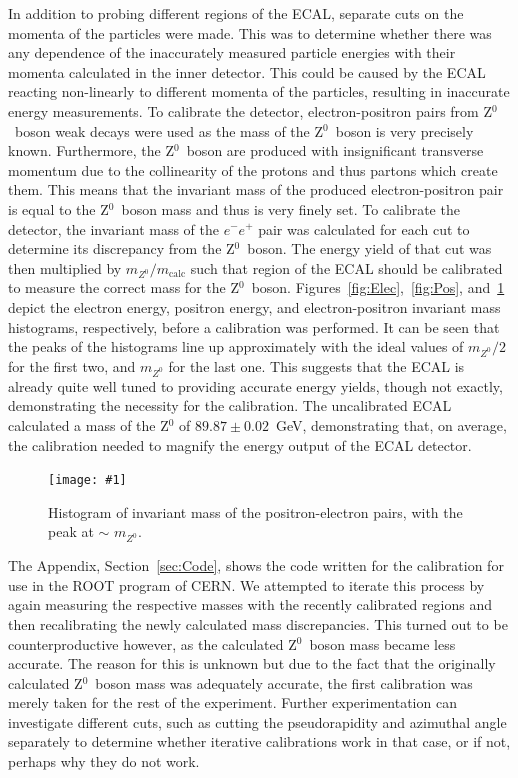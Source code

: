 \documentclass[twocolumn]{article}
\newcommand{\insertFigure}[1]{%
   \texttt{[image: \#1]}%
}
\begin{document}
\par In addition to probing different regions of the ECAL, separate cuts on the momenta of the particles were made. This was to determine whether there was any dependence of the inaccurately measured particle energies with their momenta calculated in the inner detector. This could be caused by the ECAL reacting non-linearly to different momenta of the particles, resulting in inaccurate energy measurements. To calibrate the detector, electron-positron pairs from Z$^0$~boson weak decays were used as the mass of the Z$^0$~boson is very precisely known. Furthermore, the Z$^0$~boson are produced with insignificant transverse momentum due to the collinearity of the protons and thus partons which create them. This means that the invariant mass of the produced electron-positron pair is equal to the Z$^0$~boson mass and thus is very finely set. To calibrate the detector, the invariant mass of the $e^-e^+$ pair was calculated for each cut to determine its discrepancy from the Z$^0$~boson. The energy yield of that cut was then multiplied by $m_{Z^0}/m_{\text{calc}}$ such that region of the ECAL should be calibrated to measure the correct mass for the Z$^0$~boson. Figures~\ref{fig:Elec},~\ref{fig:Pos}, and~\ref{fig:Inv} depict the electron energy, positron energy, and electron-positron invariant mass histograms, respectively, before a calibration was performed. It can be seen that the peaks of the histograms line up approximately with the ideal values of $m_{Z^0}/2$ for the first two, and $m_{Z^0}$ for the last one. This suggests that the ECAL is already quite well tuned to providing accurate energy yields, though not exactly, demonstrating the necessity for the calibration. The uncalibrated ECAL calculated a mass of the Z$^0$ of $89.87 
\pm 0.02$~GeV, demonstrating that, on average, the calibration needed to magnify the energy output of the ECAL detector.\\
\begin{figure} [!h]
	\centering
	\insertFigure{Images/InvMassLabeled.png}
	\caption{Histogram of invariant mass of the positron-electron pairs, with the peak at $\sim$ $m_{Z^0}$.}
	\label{fig:Inv}
\end{figure}
\par The Appendix, Section~\ref{sec:Code}, shows the code written for the calibration for use in the ROOT program of CERN. We attempted to iterate this process by again measuring the respective masses with the recently calibrated regions and then recalibrating the newly calculated mass discrepancies. This turned out to be counterproductive however, as the calculated Z$^0$~boson mass became less accurate. The reason for this is unknown but due to the fact that the originally calculated Z$^0$~boson mass was adequately accurate, the first calibration was merely taken for the rest of the experiment. Further experimentation can investigate different cuts, such as cutting the pseudorapidity and azimuthal angle separately to determine whether iterative calibrations work in that case, or if not, perhaps why they do not work. \\
\end{document}
